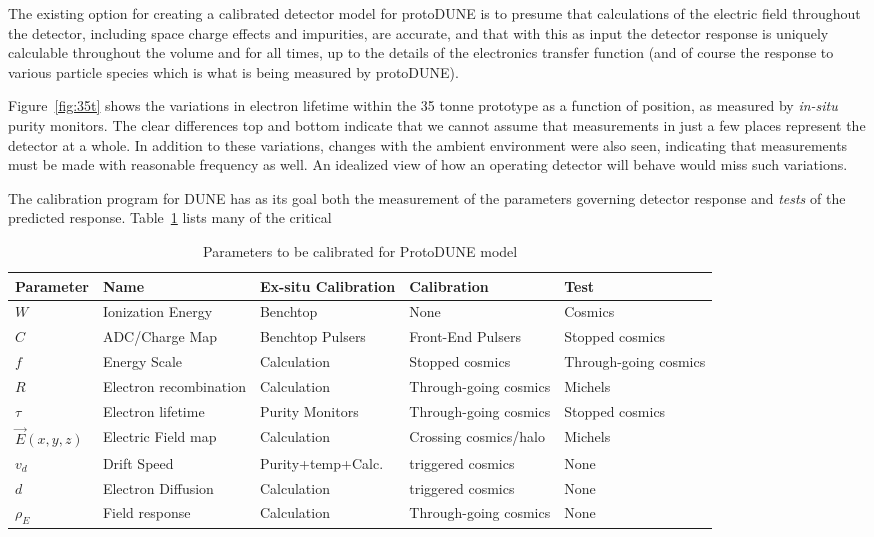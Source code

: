	The existing option for creating a calibrated detector model for
protoDUNE is to presume that calculations of the electric field throughout the
detector, including space charge effects and impurities, are accurate, and that
with this as input the detector response is uniquely calculable throughout the
volume and for all times, up to the details of the electronics transfer
function (and of course the response to various particle species which is what
is being measured by protoDUNE).  

	Figure~\ref{fig:35t} shows the variations in electron lifetime within
the 35 tonne prototype as a function of position, as measured by {\it in-situ}
purity monitors. The clear differences top and bottom indicate that we cannot
assume that measurements in just a few places represent the detector at a
whole. In addition to these variations, changes with the ambient environment
were also seen, indicating that measurements must be made with reasonable
frequency as well.  An idealized view of how an operating detector will behave
would miss such variations.
	 
	        The calibration program for DUNE has as its goal both the
measurement of the parameters governing detector response and {\it tests} of
the predicted response.  Table~\ref{tbl:params} lists many of the critical
\begin{table}
\begin{center}
\begin{tabular}{|l|l|l|l|l|} \hline \hline
{\bf Parameter} & {\bf Name} & {\bf Ex-situ Calibration} & {\bf Calibration} & {\bf Test} \\ \hline
$W$ & Ionization Energy  & Benchtop & None & Cosmics \\
$C$ & ADC/Charge Map & Benchtop Pulsers & Front-End Pulsers & Stopped cosmics \\
$f$ & Energy Scale & Calculation & Stopped cosmics & Through-going cosmics \\
$R$ & Electron recombination & Calculation & Through-going cosmics & Michels\\
$\tau$ & Electron lifetime & Purity Monitors & Through-going cosmics & Stopped
cosmics\\
$\vec{E}(x,y,z)$ & Electric Field map & Calculation & Crossing cosmics/halo &
Michels \\
$v_d$ & Drift Speed & Purity+temp+Calc.& triggered cosmics & None \\
$d$ & Electron Diffusion & Calculation & triggered cosmics & None \\
$\rho_E$ & Field response & Calculation & Through-going cosmics & None \\
\end{tabular}
\caption{Parameters to be calibrated for ProtoDUNE model\label{tbl:params}}
\end{center}
\end{table}

